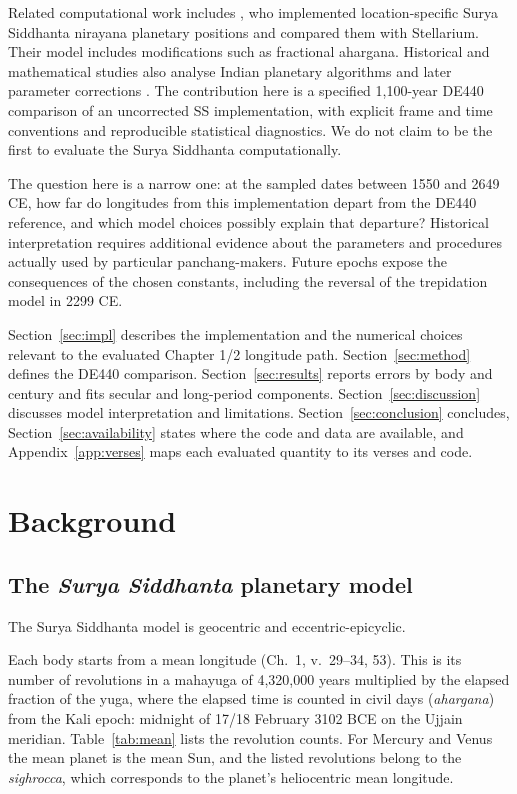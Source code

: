 \documentclass[11pt,a4paper]{article}
\begin{document}
Related computational work includes \citet{santhoju2025}, who implemented location-specific Surya Siddhanta nirayana planetary positions and compared them with Stellarium. Their model includes modifications such as fractional ahargana. Historical and mathematical studies also analyse Indian planetary algorithms and later parameter corrections \citep{pingree1978,duke2005,plofker2009}. The contribution here is a specified 1,100-year DE440 comparison of an uncorrected SS implementation, with explicit frame and time conventions and reproducible statistical diagnostics. We do not claim to be the first to evaluate the Surya Siddhanta computationally.

The question here is a narrow one: at the sampled dates between 1550 and 2649 CE, how far do longitudes from this implementation depart from the DE440 reference, and which model choices possibly explain that departure? Historical interpretation requires additional evidence about the parameters and procedures actually used by particular panchang-makers. Future epochs expose the consequences of the chosen constants, including the reversal of the trepidation model in 2299 CE.

Section~\ref{sec:impl} describes the implementation and the numerical choices relevant to the evaluated Chapter 1/2 longitude path. Section~\ref{sec:method} defines the DE440 comparison. Section~\ref{sec:results} reports errors by body and century and fits secular and long-period components. Section~\ref{sec:discussion} discusses model interpretation and limitations. Section~\ref{sec:conclusion} concludes, Section~\ref{sec:availability} states where the code and data are available, and Appendix~\ref{app:verses} maps each evaluated quantity to its verses and code.

\section{Background}

\subsection{The \textit{Surya Siddhanta} planetary model}

The Surya Siddhanta model is geocentric and eccentric-epicyclic.

Each body starts from a mean longitude (Ch.~1, v.~29--34, 53). This is its number of revolutions in a mahayuga of 4,320,000 years multiplied by the elapsed fraction of the yuga, where the elapsed time is counted in civil days (\textit{ahargana}) from the Kali epoch: midnight of 17/18 February 3102 BCE on the Ujjain meridian. Table~\ref{tab:mean} lists the revolution counts. For Mercury and Venus the mean planet is the mean Sun, and the listed revolutions belong to the \textit{sighrocca}, which corresponds to the planet's heliocentric mean longitude.
\end{document}
